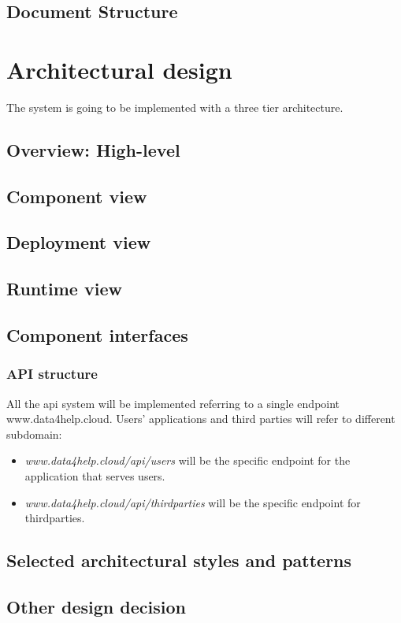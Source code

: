 \documentclass{article}
\begin{document}
\subsection{Document Structure}
\section{Architectural design}

The system is going to be implemented with a three tier architecture. 

\subsection{Overview: High-level}
\subsection{Component view}
\subsection{Deployment view}
\subsection{Runtime view}
\subsection{Component interfaces}
\subsubsection{API structure}

All the api system will be implemented referring to a single endpoint www.data4help.cloud. Users' applications and third parties will refer to different subdomain:

\begin{itemize}
	\item \textit{www.data4help.cloud/api/users} will be the specific endpoint for the application that serves users.
	\item \textit{www.data4help.cloud/api/thirdparties} will be the specific endpoint for thirdparties.
\end{itemize}


\subsection{Selected architectural styles and patterns}
\subsection{Other design decision}
\end{document}
